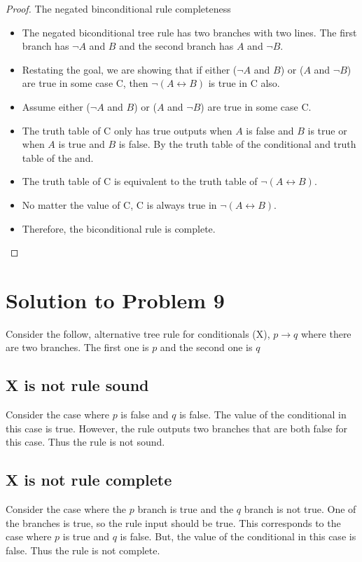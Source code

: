 \documentclass[12pt]{article}
\begin{document}
\begin{proof} The negated binconditional rule completeness
    \begin{itemize}
        \item The negated biconditional tree rule has two branches with two lines. The first branch has $\neg A$ and $B$ and the second branch has $A$ and $\neg B$. 
        \item Restating the goal, we are showing that if either ($\neg A$ and $B$) or ($A$ and $\neg B$) are true in some case C, then $\neg (A \leftrightarrow B)$ is true in C also.
        \item Assume either ($\neg A$ and $B$) or ($A$ and $\neg B$) are true in some case C.
        \item The truth table of C only has true outputs when $A$ is false and $B$ is true or when $A$ is true and $B$ is false. By the truth table of the conditional and truth table of the and. 
        \item The truth table of C is equivalent to the truth table of $\neg (A \leftrightarrow B)$.
        \item No matter the value of C, C is always true in $\neg (A \leftrightarrow B)$.
        \item Therefore, the biconditional rule is complete.
    \end{itemize}
\end{proof}


\section*{Solution to Problem 9}

Consider the follow, alternative tree rule for conditionals (X), $p \rightarrow q$ where there are two branches. The first one is $p$ and the second one is $q$


\subsection*{X is not rule sound}
Consider the case where $p$ is false and $q$ is false. The value of the conditional in this case is true. However, the rule outputs two branches that are both false for this case. Thus the rule is not sound. 


\subsection*{X is not rule complete}
Consider the case where the $p$ branch is true and the $q$ branch is not true. One of the branches is true, so the rule input should be true. This corresponds to the case where $p$ is true and $q$ is false. But, the value of the conditional in this case is false. Thus the rule is not complete.
\end{document}
